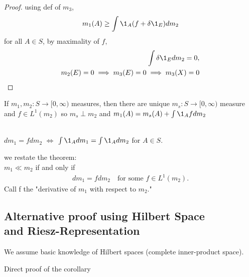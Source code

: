 \begin{proof}
	using def of $m_3$,
	\begin{align*}
		m_1 (A) \geq \int \1_A (f + \delta \1_E ) d m_2
	\end{align*}
	for all $A \in S$, by maximality of $f,$
	\begin{align*}
		\int \delta \1_E dm_2 = 0, \\
		m_2 (E) = 0 \implies m_3 (E) = 0 \implies m_3 (X) = 0
	\end{align*}
\end{proof}



\begin{corollary}
	If $m_1, m_2 : S \to [0, \infty)$	 measures, then there are unique $m_s :S \to [0, \infty)$ measure and
	$f \in L^{1} (m_2)$ so $m_s \perp m_2$ and $m_1 (A) = m_s (A) + \int \1_A f d m_2$
\end{corollary}

\begin{remark*}[Notation] \\
	$d m_1 = f dm_2$ $\iff $ $\int \1_A d m_1 = \int \1_A d m_2$ for $A \in S$.
\end{remark*}

\begin{theorem} we restate the theorem: \\
	$m_1 \ll m_2$ if and only if
	\begin{align*}
		d m_1 = f d m_2 \quad \text{for some } f \in L^1 (m_2) .
	\end{align*}
	Call f the "derivative of $m_1$ with respect to $m_2$."
\end{theorem}

\subsection[Alternative proof using Hilbert Space and Riesz-Representation]{\texorpdfstring{Alternative proof using Hilbert Space \\ and Riesz-Representation}{Alternative proof using Hilbert Space and Riesz-Representation}}

We assume basic knowledge of Hilbert spaces (complete inner-product space).

Direct proof of the corollary

